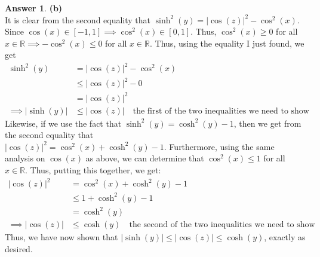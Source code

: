 \documentclass[10pt,a4paper]{article}
\theoremstyle{definition}
\newtheorem*{answer*}{Answer}
\begin{document}
\begin{answer*}{\textbf{(b)}}
\\It is clear from the second equality that $\sinh^2(y) = |\cos(z)|^2 - \cos^2(x)$. Since $\cos(x) \in [-1, 1] \implies \cos^2(x) \in [0,1]$. Thus, $\cos^2(x) \geq 0$ for all $x \in \mathbb{R} \implies -\cos^2(x) \leq 0$ for all $x \in \mathbb{R}$. Thus, using the equality I just found, we get
\begin{align*}
\sinh^2(y) &= |\cos(z)|^2 - \cos^2(x)\\
&\leq |\cos(z)|^2 - 0\\
&= |\cos(z)|^2\\
\implies |\sinh(y)| &\leq |\cos(z)| \quad \text{the first of the two inequalities we need to show}
\end{align*}
Likewise, if we use the fact that $\sinh^2(y) = \cosh^2(y) - 1$, then we get from the second equality that \\$|\cos(z)|^2 = \cos^2(x) + \cosh^2(y) - 1$. Furthermore, using the same analysis on $\cos(x)$ as above, we can determine that $\cos^2(x) \leq 1$ for all $x \in \mathbb{R}$. Thus, putting this together, we get:
\begin{align*}
|\cos(z)|^2 &= \cos^2(x) + \cosh^2(y) - 1\\
&\leq 1 + \cosh^2(y) - 1\\
&= \cosh^2(y)\\
\implies |\cos(z)| &\leq \cosh(y) \quad \text{the second of the two inequalities we need to show}
\end{align*}
Thus, we have now shown that $|\sinh(y)| \leq |\cos(z)| \leq \cosh(y)$, exactly as desired. 
\end{answer*}
\end{document}
